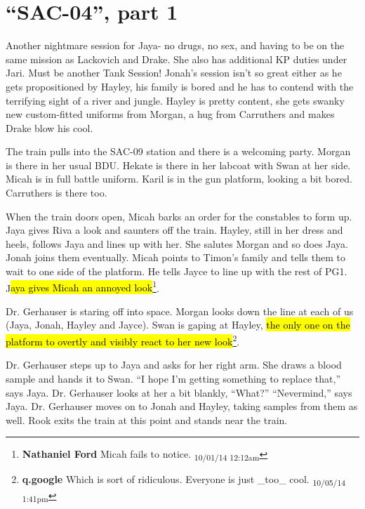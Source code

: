 \setcounter{chapter}{ 32 }
\chapter{\textbf{``SAC-04'', part 1} }





Another nightmare session for Jaya- no drugs, no sex, and having to be on the same mission as Lackovich and Drake.  She also has additional KP duties under Jari.  Must be another Tank Session!   Jonah's session isn't so great either as he gets propositioned by Hayley, his family is bored and he has to contend with the terrifying sight of a river and jungle.  Hayley is pretty content, she gets swanky new custom-fitted uniforms from Morgan, a hug from Carruthers and makes Drake blow his cool.  




The train pulls into the SAC-09 station and there is a welcoming party.  Morgan is there in her usual BDU.  Hekate is there in her labcoat with Swan at her side.  Micah is in full battle uniform.  Karil is in the gun platform, looking a bit bored.  Carruthers is there too.



When the train doors open, Micah barks an order for the constables to form up.  Jaya gives Riva a look and saunters off the train. Hayley, still in her dress and heels, follows Jaya and lines up with her.  She salutes Morgan and so does Jaya.  Jonah joins them eventually.  Micah points to Timon's family and tells them to wait to one side of the platform.  He tells Jayce to line up with the rest of PG1.  J\hl{aya gives Micah an annoyed look}\footnote{\textbf{Nathaniel Ford }Micah fails to notice. \textsubscript{10/01/14 12:12am}}.



Dr. Gerhauser is staring off into space.  Morgan looks down the line at each of us (Jaya, Jonah, Hayley and Jayce).  Swan is gaping at Hayley, \hl{the only one on the platform to overtly and visibly react to her new look}\footnote{\textbf{q.google }Which is sort of ridiculous.  Everyone is just \_too\_ cool. \textsubscript{10/05/14 1:41pm}}.  



Dr. Gerhauser steps up to Jaya and asks for her right arm.  She draws a blood sample and hands it to Swan.  ``I hope I'm getting something to replace that,'' says Jaya.  Dr. Gerhauser looks at her a bit blankly, ``What?''  ``Nevermind,'' says Jaya.  Dr. Gerhauser moves on to Jonah and Hayley, taking samples from them as well.  Rook exits the train at this point and stands near the train.  



